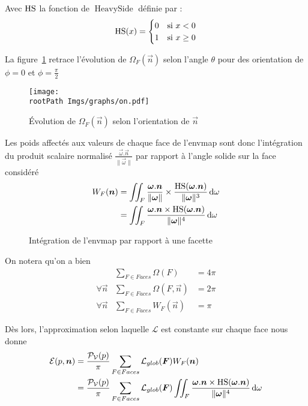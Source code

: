 \documentclass[10pt,a4paper,twoside, twocolumn]{report}
\newcommand*{\rootPath}{../}
\begin{document}
Avec $\operatorname{HS}$ la fonction de $\operatorname{HeavySide}$ définie par :
\begin{align}
	\operatorname{HS}(x) = \begin{cases} 0 &\text{si } x<0 \\ 1 & \text{si } x\geq 0\end{cases} \notag
\end{align}

La figure~\ref{fig:curve:omega_theta} retrace l'évolution de $\Omega_F(\vec n)$ selon l'angle $\theta$ pour des orientation de $\phi=0$ et $\phi=\frac{\pi}{2}$

\begin{figure}[!ht]\centering
	\texttt{[image: \\rootPath Imgs/graphs/on.pdf]}
	\caption{Évolution de $\Omega_F(\vec n)$ selon l'orientation de $\vec n$}
	\label{fig:curve:omega_theta}
\end{figure}

Les poids affectés aux valeurs de chaque face de l'envmap sont donc l'intégration du produit scalaire normalisé $\frac{\vec\omega.\vec n}{\|\vec \omega\|}$ par rapport à l'angle solide sur la face considéré
\begin{align}
	W_F(\vec n)
		&= \iint_{F}\frac{\vec\omega.\vec n}{\|\vec \omega\|}\times\frac{\Hs(\vec\omega.\vec n)}{\|\vec\omega\|^3}\, \mathrm d\omega \notag\\
		&= \iint_{F}\frac{\vec\omega.\vec n\times\Hs(\vec\omega.\vec n)}{\|\vec\omega\|^4}\, \mathrm d\omega
		\label{ref:eq:wintegral}
\end{align}

\begin{figure}[!ht]
	\centering
	
	\caption{Intégration de l'envmap par rapport à une facette}
	\label{fig:tikz:envmapFacet}
\end{figure}

On notera qu'on a bien 
\begin{subequations}
	\begin{align}
					& \sum_{F \in Faces} \Omega(F) 								&=4\pi\\
	\forall \vec n	& \sum_{F \in Faces} \Omega(F,\vec n)	&=2\pi\\	
	\forall \vec n	& \sum_{F \in Faces} W_F(\vec n)			&=\pi	
	\end{align}
\end{subequations}

Dès lors, l'approximation selon laquelle $\mathcal L$ est constante sur chaque face nous donne
\begin{align}
	\mathcal E(p, \vec n)
		& = \frac{\mathcal P_{\mathcal V}(p)}{\pi}\sum_{F \in Faces}\mathcal L_{glob}(\vec F)W_F(\vec n) \notag \\
		& = \frac{\mathcal P_{\mathcal V}(p)}{\pi}\sum_{F \in Faces}\mathcal L_{glob}(\vec F)\iint_{F}\frac{\vec\omega.\vec n\times\Hs(\vec\omega.\vec n)}{\|\vec\omega\|^4}\, \mathrm d\omega
		\label{ref:eq:sumintegral_model}
\end{align}
\end{document}
